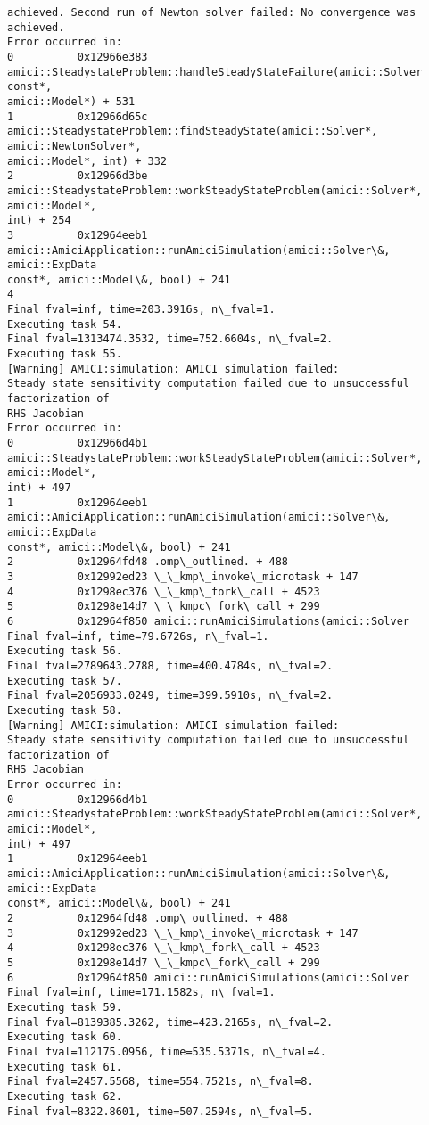 \documentclass[11pt]{article}
\begin{document}
\begin{Verbatim}[commandchars=\\\{\}]
achieved. Second run of Newton solver failed: No convergence was achieved.
Error occurred in:
0          0x12966e383
amici::SteadystateProblem::handleSteadyStateFailure(amici::Solver const*,
amici::Model*) + 531
1          0x12966d65c
amici::SteadystateProblem::findSteadyState(amici::Solver*, amici::NewtonSolver*,
amici::Model*, int) + 332
2          0x12966d3be
amici::SteadystateProblem::workSteadyStateProblem(amici::Solver*, amici::Model*,
int) + 254
3          0x12964eeb1
amici::AmiciApplication::runAmiciSimulation(amici::Solver\&, amici::ExpData
const*, amici::Model\&, bool) + 241
4
Final fval=inf, time=203.3916s, n\_fval=1.
Executing task 54.
Final fval=1313474.3532, time=752.6604s, n\_fval=2.
Executing task 55.
[Warning] AMICI:simulation: AMICI simulation failed:
Steady state sensitivity computation failed due to unsuccessful factorization of
RHS Jacobian
Error occurred in:
0          0x12966d4b1
amici::SteadystateProblem::workSteadyStateProblem(amici::Solver*, amici::Model*,
int) + 497
1          0x12964eeb1
amici::AmiciApplication::runAmiciSimulation(amici::Solver\&, amici::ExpData
const*, amici::Model\&, bool) + 241
2          0x12964fd48 .omp\_outlined. + 488
3          0x12992ed23 \_\_kmp\_invoke\_microtask + 147
4          0x1298ec376 \_\_kmp\_fork\_call + 4523
5          0x1298e14d7 \_\_kmpc\_fork\_call + 299
6          0x12964f850 amici::runAmiciSimulations(amici::Solver
Final fval=inf, time=79.6726s, n\_fval=1.
Executing task 56.
Final fval=2789643.2788, time=400.4784s, n\_fval=2.
Executing task 57.
Final fval=2056933.0249, time=399.5910s, n\_fval=2.
Executing task 58.
[Warning] AMICI:simulation: AMICI simulation failed:
Steady state sensitivity computation failed due to unsuccessful factorization of
RHS Jacobian
Error occurred in:
0          0x12966d4b1
amici::SteadystateProblem::workSteadyStateProblem(amici::Solver*, amici::Model*,
int) + 497
1          0x12964eeb1
amici::AmiciApplication::runAmiciSimulation(amici::Solver\&, amici::ExpData
const*, amici::Model\&, bool) + 241
2          0x12964fd48 .omp\_outlined. + 488
3          0x12992ed23 \_\_kmp\_invoke\_microtask + 147
4          0x1298ec376 \_\_kmp\_fork\_call + 4523
5          0x1298e14d7 \_\_kmpc\_fork\_call + 299
6          0x12964f850 amici::runAmiciSimulations(amici::Solver
Final fval=inf, time=171.1582s, n\_fval=1.
Executing task 59.
Final fval=8139385.3262, time=423.2165s, n\_fval=2.
Executing task 60.
Final fval=112175.0956, time=535.5371s, n\_fval=4.
Executing task 61.
Final fval=2457.5568, time=554.7521s, n\_fval=8.
Executing task 62.
Final fval=8322.8601, time=507.2594s, n\_fval=5.

\end{Verbatim}
\end{document}
